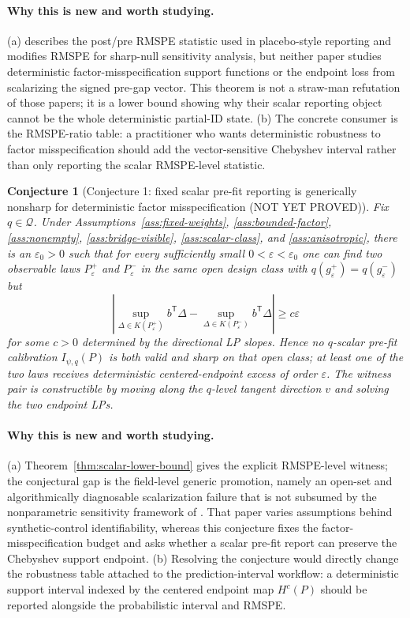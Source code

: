 \documentclass[11pt]{article}
\newcommand{\transpose}{\mathsf{T}}
\theoremstyle{definition}
\theoremstyle{plain}
\newtheorem{conjecture}{Conjecture}
\theoremstyle{remark}
\begin{document}
\paragraph{Why this is new and worth studying.}
(a) \citet{Abadie2021} describes the post/pre RMSPE statistic used in placebo-style reporting and \citet{FirpoPossebom2018} modifies RMSPE for sharp-null sensitivity analysis, but neither paper studies deterministic factor-misspecification support functions or the endpoint loss from scalarizing the signed pre-gap vector. This theorem is not a straw-man refutation of those papers; it is a lower bound showing why their scalar reporting object cannot be the whole deterministic partial-ID state. (b) The concrete consumer is the \citet{Abadie2021} RMSPE-ratio table: a practitioner who wants deterministic robustness to factor misspecification should add the vector-sensitive Chebyshev interval rather than only reporting the scalar RMSPE-level statistic.

\begin{conjecture}[Conjecture 1: fixed scalar pre-fit reporting is generically nonsharp for deterministic factor misspecification (NOT YET PROVED)]\label{conj:scalar-nonsharp}
Fix \(q\in\mathcal Q\). Under Assumptions~\ref{ass:fixed-weights}, \ref{ass:bounded-factor}, \ref{ass:nonempty}, \ref{ass:bridge-visible}, \ref{ass:scalar-class}, and \ref{ass:anisotropic}, there is an \(\varepsilon_0>0\) such that for every sufficiently small \(0<\varepsilon<\varepsilon_0\) one can find two observable laws \(P_\varepsilon^+\) and \(P_\varepsilon^-\) in the same open design class with \(q(g_\varepsilon^+)=q(g_\varepsilon^-)\) but
\[
\left|\sup_{\Delta\in K(P_\varepsilon^+)}b^\transpose\Delta
-\sup_{\Delta\in K(P_\varepsilon^-)}b^\transpose\Delta\right|
\ge c\varepsilon
\]
for some \(c>0\) determined by the directional LP slopes. Hence no \(q\)-scalar pre-fit calibration \(I_{\psi,q}(P)\) is both valid and sharp on that open class; at least one of the two laws receives deterministic centered-endpoint excess of order \(\varepsilon\). The witness pair is constructible by moving along the \(q\)-level tangent direction \(v\) and solving the two endpoint LPs.
\end{conjecture}
\paragraph{Why this is new and worth studying.}
(a) Theorem~\ref{thm:scalar-lower-bound} gives the explicit RMSPE-level witness; the conjectural gap is the field-level generic promotion, namely an open-set and algorithmically diagnosable scalarization failure that is not subsumed by the nonparametric sensitivity framework of \citet{ZeitlerVlontzosGilliganLee2023}. That paper varies assumptions behind synthetic-control identifiability, whereas this conjecture fixes the factor-misspecification budget and asks whether a scalar pre-fit report can preserve the Chebyshev support endpoint. (b) Resolving the conjecture would directly change the robustness table attached to the \citet{CattaneoFengTitiunik2021} prediction-interval workflow: a deterministic support interval indexed by the centered endpoint map \(H^c(P)\) should be reported alongside the probabilistic interval and RMSPE.
\end{document}
